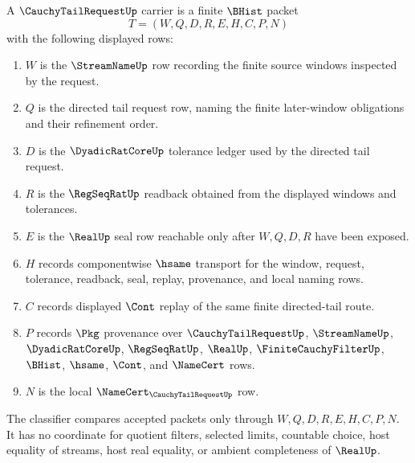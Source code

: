 \begin{definition}
\label{def:cauchy-tail-request-carrier}
A $\CauchyTailRequestUp$ carrier is a finite $\BHist$ packet
$$
T=(W,Q,D,R,E,H,C,P,N)
$$
with the following displayed rows:
\begin{enumerate}
\item $W$ is the $\StreamNameUp$ row recording the finite source windows inspected by the request.
\item $Q$ is the directed tail request row, naming the finite later-window obligations and their refinement order.
\item $D$ is the $\DyadicRatCoreUp$ tolerance ledger used by the directed tail request.
\item $R$ is the $\RegSeqRatUp$ readback obtained from the displayed windows and tolerances.
\item $E$ is the $\RealUp$ seal row reachable only after $W,Q,D,R$ have been exposed.
\item $H$ records componentwise $\hsame$ transport for the window, request, tolerance, readback, seal, replay, provenance, and local naming rows.
\item $C$ records displayed $\Cont$ replay of the same finite directed-tail route.
\item $P$ records $\Pkg$ provenance over $\CauchyTailRequestUp$, $\StreamNameUp$, $\DyadicRatCoreUp$, $\RegSeqRatUp$, $\RealUp$, $\FiniteCauchyFilterUp$, $\BHist$, $\hsame$, $\Cont$, and $\NameCert$ rows.
\item $N$ is the local $\NameCert_{\CauchyTailRequestUp}$ row.
\end{enumerate}
The classifier compares accepted packets only through $W,Q,D,R,E,H,C,P,N$. It has no coordinate for quotient filters, selected limits, countable choice, host equality of streams, host real equality, or ambient completeness of $\RealUp$.
\end{definition}

